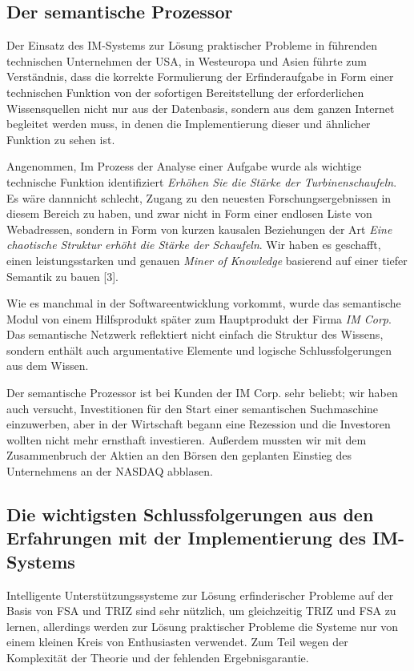 \documentclass[11pt,a4paper]{article}
\begin{document}
\subsection{Der semantische Prozessor}

Der Einsatz des IM-Systems zur Lösung praktischer Probleme in führenden
technischen Unternehmen der USA, in Westeuropa und Asien führte zum
Verständnis, dass die korrekte Formulierung der Erfinderaufgabe in Form einer
technischen Funktion von der sofortigen Bereitstellung der erforderlichen
Wissensquellen nicht nur aus der Datenbasis, sondern aus dem ganzen Internet
begleitet werden muss, in denen die Implementierung dieser und ähnlicher
Funktion zu sehen ist.

Angenommen, Im Prozess der Analyse einer Aufgabe wurde als wichtige technische
Funktion identifiziert \emph{Erhöhen Sie die Stärke der Turbinenschaufeln}. Es
wäre dannnicht schlecht, Zugang zu den neuesten Forschungsergebnissen in
diesem Bereich zu haben, und zwar nicht in Form einer endlosen Liste von
Webadressen, sondern in Form von kurzen kausalen Beziehungen der Art
\emph{Eine chaotische Struktur erhöht die Stärke der Schaufeln}. Wir haben es
geschafft, einen leistungsstarken und genauen \emph{Miner of Knowledge}
basierend auf einer tiefer Semantik zu bauen [3].

Wie es manchmal in der Softwareentwicklung vorkommt, wurde das semantische
Modul von einem Hilfsprodukt später zum Hauptprodukt der Firma \emph{IM Corp}.
Das semantische Netzwerk reflektiert nicht einfach die Struktur des Wissens,
sondern enthält auch argumentative Elemente und logische Schlussfolgerungen
aus dem Wissen.

Der semantische Prozessor ist bei Kunden der IM Corp. sehr beliebt; wir haben
auch versucht, Investitionen für den Start einer semantischen Suchmaschine
einzuwerben, aber in der Wirtschaft begann eine Rezession und die Investoren
wollten nicht mehr ernsthaft investieren. Außerdem mussten wir mit dem
Zusammenbruch der Aktien an den Börsen den geplanten Einstieg des Unternehmens
an der NASDAQ abblasen.

\subsection{Die wichtigsten Schlussfolgerungen aus den Erfahrungen mit der
  Implementierung des IM-Systems}

Intelligente Unterstützungssysteme zur Lösung erfinderischer Probleme auf der
Basis von FSA und TRIZ sind sehr nützlich, um gleichzeitig TRIZ und FSA zu
lernen, allerdings werden zur Lösung praktischer Probleme die Systeme nur von
einem kleinen Kreis von Enthusiasten verwendet. Zum Teil wegen der Komplexität
der Theorie und der fehlenden Ergebnisgarantie.
\end{document}
